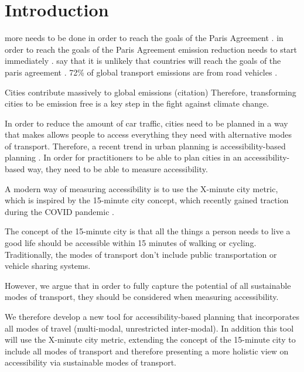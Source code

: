 \clearpage
\section{Introduction}
\label{sec:introduction}



more needs to be done in order to reach the goals of the Paris Agreement \cite{mitchellMyriadChallengesParis2018}.
in order to reach the goals of the Paris Agreement emission reduction needs to start immediately \cite{krieglerPathwaysLimitingWarming2018}.
say that it is unlikely that countries will reach the goals of the paris agreement \cite{liuCountrybasedRateEmissions2021}.
72\% of global transport emissions are from road vehicles \cite{Sims2014Transport}.


Cities contribute massively to global emissions (citation)
Therefore, transforming cities to be emission free is a key step in the fight against climate change.


In order to reduce the amount of car traffic, cities need to be planned in a way that makes allows people to access everything they need with alternative modes of transport.
Therefore, a recent trend in urban planning is accessibility-based planning \cite{proffittAccessibilityPlanningAmerican2019} \cite{geursAccessibilityEvaluationLanduse2004a}.
In order for practitioners to be able to plan cities in an accessibility-based way, they need to be able to measure accessibility.

A modern way of measuring accessibility is to use the X-minute city metric, which is inspired by the 15-minute city concept, which recently gained traction during the COVID pandemic \cite{morenoIntroducing15MinuteCity2021}.

The concept of the 15-minute city is that all the things a person needs to live a good life should be accessible within 15 minutes of walking or cycling.
Traditionally, the modes of transport don't include public transportation or vehicle sharing systems.

However, we argue that in order to fully capture the potential of all sustainable modes of transport, they should be considered when measuring accessibility.

We therefore develop a new tool for accessibility-based planning that incorporates all modes of travel (multi-modal, unrestricted inter-modal).
In addition this tool will use the X-minute city metric, extending the concept of the 15-minute city to include all modes of transport and therefore presenting a more holistic view on accessibility via sustainable modes of transport.



